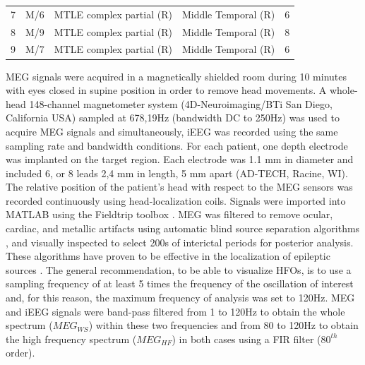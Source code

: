 \begin{table}[!h]
\begin{tabular}{ccccc}
7                    & M/6                         & MTLE complex partial (R)         & Middle Temporal (R)                                                                     & 6                                                             \\
8                    & M/9                         & MTLE complex partial (R)         & Middle Temporal (R)                                                                     & 8                                                             \\
9                    & M/7                         & MTLE complex partial (R)         & Middle Temporal (R)                                                                     & 6                                                            
\end{tabular}
\end{table}

MEG signals were acquired in a magnetically shielded room during 10 minutes with eyes closed in supine position in order to remove head movements. A whole-head 148-channel magnetometer system (4D-Neuroimaging/BTi San Diego, California USA) sampled at 678,19Hz (bandwidth DC to 250Hz) was used to acquire MEG signals and simultaneously, iEEG was recorded using the same sampling rate and bandwidth conditions. For each patient, one depth electrode was implanted on the target region. Each electrode was 1.1 mm in diameter and included 6, or 8 leads 2,4 mm in length, 5 mm apart (AD-TECH, Racine, WI). The relative position of the patient’s head with respect to the MEG sensors was recorded continuously using head-localization coils. Signals were imported into MATLAB using the Fieldtrip toolbox \citep{Oostenveld2011}. MEG was filtered to remove ocular, cardiac, and metallic artifacts using automatic blind source separation algorithms \citep{Migliorelli2015,Romero2009}, and visually inspected to select 200s of interictal periods for posterior analysis. These algorithms have proven to be effective in the localization of epileptic sources \citep{Migliorelli2016}. The general recommendation, to be able to visualize HFOs, is to use a sampling frequency of at least 5 times the frequency of the oscillation of interest \citep{Worrel2012} and, for this reason, the maximum frequency of analysis was set to 120Hz. MEG and iEEG signals were band-pass filtered from 1 to 120Hz to obtain the whole spectrum ($MEG_{WS}$) within these two frequencies and from 80 to 120Hz to obtain the high frequency spectrum ($MEG_{HF}$) in both cases using a FIR filter ($80^{th}$ order). 

